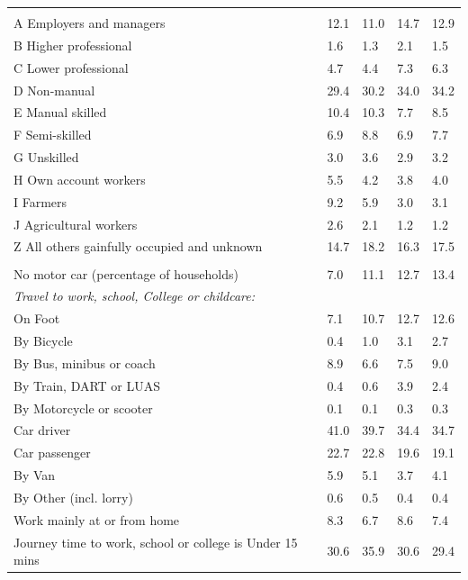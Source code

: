 \documentclass{article}
\begin{document}
\begin{table}[h]
\begin{tabular}{KTTTT}
\hline
    \\ 
    \hline
A Employers and managers & 12.1& 11.0& 14.7& 12.9\\
B Higher professional & 1.6& 1.3& 2.1& 1.5\\
C Lower professional & 4.7& 4.4& 7.3& 6.3\\
D Non-manual & 29.4& 30.2& 34.0& 34.2\\
E Manual skilled & 10.4& 10.3&  7.7&  8.5\\
F Semi-skilled & 6.9& 8.8& 6.9& 7.7\\
G Unskilled & 3.0& 3.6& 2.9& 3.2\\
H Own account workers & 5.5& 4.2& 3.8& 4.0\\
I Farmers & 9.2& 5.9& 3.0& 3.1\\
J Agricultural workers & 2.6& 2.1& 1.2& 1.2\\
Z All others gainfully occupied and unknown & 14.7& 18.2& 16.3& 17.5\\
\hline
{}\hline
    \\ 
    \hline
No motor car (percentage of households) &  7.0& 11.1& 12.7& 
13.4\\
    \hline 
\emph{Travel to work, school, College or childcare:} & & & \\
\quad On Foot &  7.1& 10.7& 12.7& 12.6\\ 
\quad By Bicycle & 0.4& 1.0& 3.1& 2.7\\ 
\quad By Bus, minibus or coach & 8.9& 6.6& 7.5& 9.0\\
\quad By Train, DART or LUAS & 0.4& 0.6& 3.9& 2.4\\
\quad By Motorcycle or scooter & 0.1& 0.1& 0.3& 0.3\\
\quad Car driver & 41.0 & 39.7& 34.4& 34.7\\
\quad Car passenger & 22.7& 22.8& 19.6& 19.1\\
\quad By Van & 5.9& 5.1& 3.7& 4.1\\
\quad By Other (incl. lorry) & 0.6& 0.5& 0.4& 0.4\\
    \hline
Work mainly at or from home & 8.3& 6.7& 8.6& 7.4\\
Journey time to work, school or college is Under 15 mins & 30.6& 35.9& 30.6& 29.4\\

\end{tabular}
\end{table}
\end{document}
